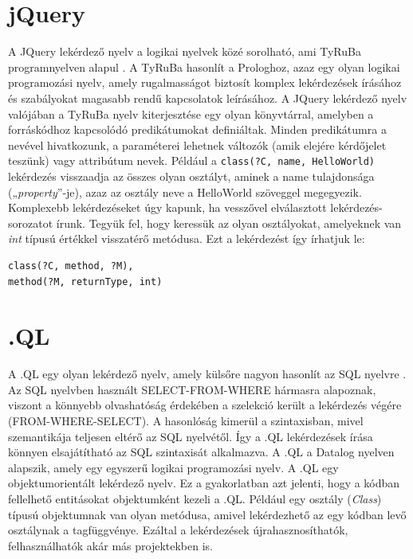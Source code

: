 \documentclass[a4paper,12pt]{report}
\begin{document}
\section{jQuery}
A JQuery lekérdező nyelv a logikai nyelvek közé sorolható, ami TyRuBa programnyelven alapul \cite{jquery}. A TyRuBa hasonlít a Prologhoz, azaz egy olyan logikai programozási nyelv, amely rugalmasságot biztosít komplex lekérdezések írásához és szabályokat magasabb rendű kapcsolatok leírásához. A JQuery lekérdező nyelv valójában a TyRuBa nyelv kiterjesztése egy olyan könyvtárral, amelyben a forráskódhoz kapcsolódó predikátumokat definiáltak. Minden predikátumra a nevével hivatkozunk, a paraméterei lehetnek változók (amik elejére kérdőjelet teszünk) vagy attribútum nevek. Például a \texttt{class(?C, name, HelloWorld)} lekérdezés visszaadja az összes olyan osztályt, aminek a name tulajdonsága („\textit{property}”-je), azaz az osztály neve a HelloWorld szöveggel megegyezik. Komplexebb lekérdezéseket úgy kapunk, ha vesszővel elválasztott lekérdezés-sorozatot írunk. Tegyük fel, hogy keressük az olyan osztályokat, amelyeknek van \textit{int} típusú értékkel visszatérő metódusa. Ezt a lekérdezést így írhatjuk le:

\begin{verbatim}
class(?C, method, ?M),
method(?M, returnType, int)
\end{verbatim}

\section{.QL}
A .QL egy olyan lekérdező nyelv, amely külsőre nagyon hasonlít az SQL nyelvre \cite{dotql}. Az SQL nyelvben használt SELECT-FROM-WHERE hármasra alapoznak, viszont a könnyebb olvashatóság érdekében a szelekció került a lekérdezés végére (FROM-WHERE-SELECT). A hasonlóság kimerül a szintaxisban, mivel szemantikája teljesen eltérő az SQL nyelvétől. Így a .QL lekérdezések írása könnyen elsajátítható az SQL szintaxisát alkalmazva. A .QL a Datalog nyelven alapszik, amely egy egyszerű logikai programozási nyelv. A .QL egy objektumorientált lekérdező nyelv. Ez a gyakorlatban azt jelenti, hogy a kódban fellelhető entitásokat objektumként kezeli a .QL. Például egy osztály (\textit{Class}) típusú objektumnak van olyan metódusa, amivel lekérdezhető az egy kódban levő osztálynak a tagfüggvénye. Ezáltal a lekérdezések újrahasznosíthatók, felhasználhatók akár más projektekben is.
\end{document}
